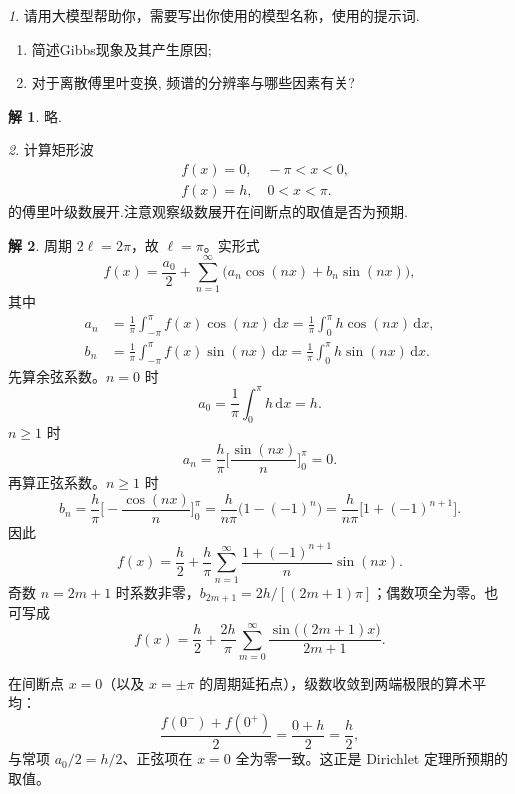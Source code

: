 \documentclass[11pt]{article}
\theoremstyle{remark}
\newtheorem{problem}{}
\theoremstyle{definition}
\newtheorem{solution}{解}
\begin{document}
\renewcommand{\labelenumi}{(\arabic{enumi})}
\renewcommand{\labelenumii}{(\arabic{enumi}.\arabic{enumii})}

\begin{problem}
  请用大模型帮助你，需要写出你使用的模型名称，使用的提示词.
  \begin{enumerate}
    \item 简述Gibbs现象及其产生原因;
    \item 对于离散傅里叶变换, 频谱的分辨率与哪些因素有关?
  \end{enumerate}
\end{problem}

\begin{solution}
略.
\end{solution}

\begin{problem}
计算矩形波
\[
\begin{aligned}
& f(x)=0, \quad-\pi<x<0, \\
& f(x)=h, \quad 0<x<\pi .
\end{aligned}
\]
的傅里叶级数展开.注意观察级数展开在间断点的取值是否为预期.
\end{problem}

\begin{solution}
周期 $2\ell=2\pi$，故 $\ell=\pi$。实形式
\[
f(x)=\frac{a_0}{2}+\sum_{n=1}^{\infty}
\bigl(a_n\cos(nx)+b_n\sin(nx)\bigr),
\]
其中
\begin{align*}
a_n
&=\frac{1}{\pi}\int_{-\pi}^{\pi}f(x)\cos(nx)\,\mathrm{d}x
=\frac{1}{\pi}\int_0^{\pi}h\cos(nx)\,\mathrm{d}x,\\
b_n
&=\frac{1}{\pi}\int_{-\pi}^{\pi}f(x)\sin(nx)\,\mathrm{d}x
=\frac{1}{\pi}\int_0^{\pi}h\sin(nx)\,\mathrm{d}x.
\end{align*}
先算余弦系数。$n=0$ 时
\[
a_0=\frac{1}{\pi}\int_0^{\pi}h\,\mathrm{d}x=h.
\]
$n\geq 1$ 时
\[
a_n
=\frac{h}{\pi}\Biggl[\frac{\sin(nx)}{n}\Biggr]_0^{\pi}=0.
\]
再算正弦系数。$n\geq 1$ 时
\[
b_n
=\frac{h}{\pi}\Biggl[-\frac{\cos(nx)}{n}\Biggr]_0^{\pi}
=\frac{h}{n\pi}\bigl(1-(-1)^n\bigr)
=\frac{h}{n\pi}\bigl[1+(-1)^{n+1}\bigr].
\]
因此
\[
f(x)
=\frac{h}{2}
+\frac{h}{\pi}\sum_{n=1}^{\infty}
\frac{1+(-1)^{n+1}}{n}\sin(nx).
\]
奇数 $n=2m+1$ 时系数非零，$b_{2m+1}=2h/[(2m+1)\pi]$；偶数项全为零。也可写成
\[
f(x)
=\frac{h}{2}
+\frac{2h}{\pi}\sum_{m=0}^{\infty}
\frac{\sin\bigl((2m+1)x\bigr)}{2m+1}.
\]

在间断点 $x=0$（以及 $x=\pm\pi$ 的周期延拓点），级数收敛到两端极限的算术平均：
\[
\frac{f(0^-)+f(0^+)}{2}=\frac{0+h}{2}=\frac{h}{2},
\]
与常项 $a_0/2=h/2$、正弦项在 $x=0$ 全为零一致。这正是 Dirichlet 定理所预期的取值。
\end{solution}
\end{document}
